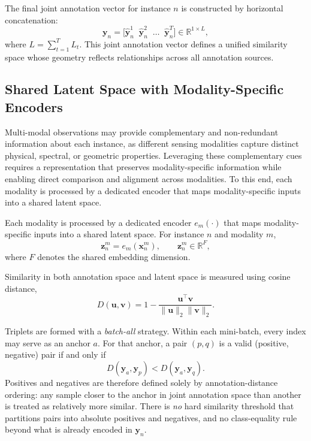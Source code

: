 \documentclass[10pt,twocolumn,letterpaper]{article}
\begin{document}
The final joint annotation vector for instance $n$ is constructed by horizontal
concatenation:
\begin{equation}
\label{eq:ann-concat}
\mathbf{y}_{n}
=
\big[
\hat{\mathbf{y}}^{1}_{n}
\;\;
\hat{\mathbf{y}}^{2}_{n}
\;\;
\dots
\;\;
\hat{\mathbf{y}}^{T}_{n}
\big]
\in
\mathbb{R}^{1 \times L},
\end{equation}
where $L = \sum_{t=1}^{T} L_t$.
This joint annotation vector defines a unified similarity space whose geometry
reflects relationships across all annotation sources.


\subsection{Shared Latent Space with Modality-Specific Encoders}
\label{subsec:shared-latent-space}
Multi-modal observations may provide complementary and non-redundant information about each instance, as different sensing modalities capture distinct physical, spectral, or geometric properties. Leveraging these complementary cues requires a representation that preserves modality-specific information while enabling direct comparison and alignment across modalities. To this end, each modality is processed by a dedicated encoder that maps modality-specific inputs into a shared latent space.

Each modality is processed by a dedicated encoder
$e_m(\cdot)$ that maps modality-specific inputs into a shared latent space.
For instance $n$ and modality $m$,
\begin{equation}
\mathbf{z}_n^{m}
=
e_m\!\left(\mathbf{x}_n^{m}\right),
\qquad
\mathbf{z}_n^{m} \in \mathbb{R}^{F},
\end{equation}
where $F$ denotes the shared embedding dimension.

Similarity in both annotation space and latent space is measured using cosine
distance,
\begin{equation}
D(\mathbf{u},\mathbf{v})
=
1 -
\frac{
\mathbf{u}^{\top}\mathbf{v}
}{
\|\mathbf{u}\|_2 \|\mathbf{v}\|_2
}.
\end{equation}

Triplets are formed with a \emph{batch-all} strategy. Within each mini-batch, every index may serve as an anchor $a$. For that anchor, a pair $(p,q)$ is a valid (positive, negative) pair if and only if
\begin{equation}
\label{eq:triplet-order}
D(\mathbf{y}_a,\mathbf{y}_p)
<
D(\mathbf{y}_a,\mathbf{y}_q).
\end{equation}
Positives and negatives are therefore defined solely by annotation-distance ordering: any sample closer to the anchor in joint annotation space than another is treated as relatively more similar. There is \emph{no} hard similarity threshold that partitions pairs into absolute positives and negatives, and no class-equality rule beyond what is already encoded in $\mathbf{y}_n$.
\end{document}
